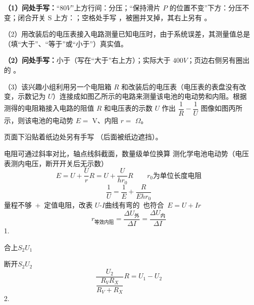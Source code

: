 \begin{problem}[粘贴印刷题 20]
\noindent\textbf{（1）问处手写：}“$80\unit{V}$”上方行间：分压；“保持滑片 $P$ 的位置不变”下方：分压不变；闭合开关 S 上方：；空格处手写 ，被圈并叉掉，其右上另有 。

（2）用改装后的电压表接入电路测量已知电压时，由于系统误差，其测量值总是 （填“大于”、“等于”或“小于”）真实值。%

\noindent\textbf{（2）问处手写：}小于（写在“大于”右上方）；实际大于 $400\unit{V}$；页边右侧另有圈出的 。

（3）该兴趣小组利用另一个电阻箱 $R$ 和改装后的电压表（电压表的表盘没有改变，示数记为 $U$）连接成如图乙所示的电路来测量该电池的电动势和内阻。根据测得的电阻箱接入电路的阻值 $R$ 和电压表的示数 $U$ 作出 $\dfrac1R-\dfrac1U$ 图像如图丙所示，则该电池的电动势 $E=$ \underline{\;} V、内阻 $r=$ \underline{\;} $\Omega$。%

\noindent 页面下沿贴着纸边处另有手写 （后面被纸边遮挡）。
\end{problem}
电阻可通过斜率对比，轴点线斜截面，数量级单位换算 %
测化学电池电动势（电压表测内电压，断开开关后无示数）
\[
E=U+\frac{U}{r}R=U+\frac{U}{hr_0}R\qquad r_0\text{为单位长度电阻}
\]
\[
\frac1U=\frac1E+\frac{R}{Ehr_0}
\]
量程不够\ +\ 定值电阻，改表
$U$-$I$曲线有弯的\ 也符合\ $E=U+Ir$
\[
r_{\text{等效内阻}}=\frac{\Delta U_{\text{外}}}{\Delta I}=\frac{\Delta U_{\text{内}}}{\Delta I}
\]
1.

合上$S_2$\quad $U_1$

断开$S_2$\quad $U_2$
\[
\frac{U_2}{\dfrac{R_VR_X}{R_V+R_X}}R=U_1-U_2
\]
2.

